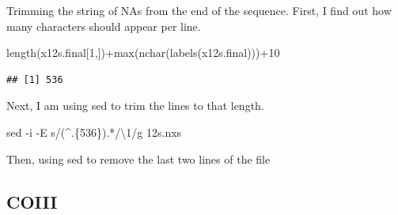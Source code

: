 \documentclass[
]{article}
\newenvironment{Shaded}{\begin{snugshade}}{\end{snugshade}}
\newcommand{\AttributeTok}[1]{\textcolor[rgb]{0.77,0.63,0.00}{#1}}
\newcommand{\DecValTok}[1]{\textcolor[rgb]{0.00,0.00,0.81}{#1}}
\newcommand{\FunctionTok}[1]{\textcolor[rgb]{0.00,0.00,0.00}{#1}}
\newcommand{\NormalTok}[1]{#1}
\newcommand{\OperatorTok}[1]{\textcolor[rgb]{0.81,0.36,0.00}{\textbf{#1}}}
\newcommand{\OtherTok}[1]{\textcolor[rgb]{0.56,0.35,0.01}{#1}}
\newcommand{\SpecialCharTok}[1]{\textcolor[rgb]{0.00,0.00,0.00}{#1}}
\newcommand{\StringTok}[1]{\textcolor[rgb]{0.31,0.60,0.02}{#1}}
\newcommand{\VariableTok}[1]{\textcolor[rgb]{0.00,0.00,0.00}{#1}}
\begin{document}
Trimming the string of NAs from the end of the sequence. First, I find
out how many characters should appear per line.

\begin{Shaded}
\begin{Highlighting}[]
\FunctionTok{length}\NormalTok{(x12s.final[}\DecValTok{1}\NormalTok{,])}\SpecialCharTok{+}\FunctionTok{max}\NormalTok{(}\FunctionTok{nchar}\NormalTok{(}\FunctionTok{labels}\NormalTok{(x12s.final)))}\SpecialCharTok{+}\DecValTok{10}
\end{Highlighting}
\end{Shaded}

\begin{verbatim}
## [1] 536
\end{verbatim}

Next, I am using sed to trim the lines to that length.

\begin{Shaded}
\begin{Highlighting}[]
\FunctionTok{sed} \AttributeTok{{-}i} \AttributeTok{{-}E} \StringTok{\textquotesingle{}s/(\^{}.\{536\}).*/\textbackslash{}1/g\textquotesingle{}}\NormalTok{ 12s.nxs}
\end{Highlighting}
\end{Shaded}

Then, using sed to remove the last two lines of the file

\begin{Shaded}
\end{Shaded}

\hypertarget{coiii}{%
\subsection{COIII}\label{coiii}}

\begin{Shaded}
\end{Shaded}
\end{document}

